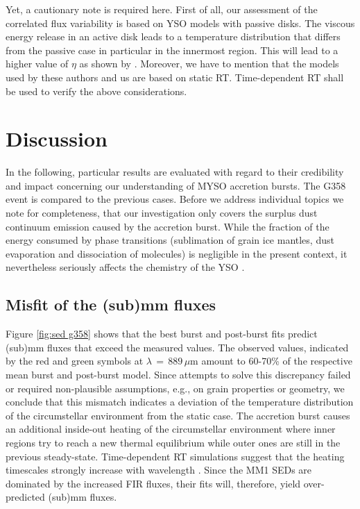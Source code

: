 Yet, a cautionary note is required here. First of all, our assessment of the correlated flux variability is based on YSO models with passive disks. The viscous energy release in an active disk leads to a temperature distribution that differs from the passive case in particular in the innermost region. This will lead to a higher value of $\eta$ as shown by \citet{10.1093/mnras/staa1254}. Moreover, we have to mention that the models used by these authors and us are based on static RT. Time-dependent RT shall be used to verify the above considerations. 

\section{Discussion}\label{disc}
In the following, particular results are evaluated with regard to their credibility and impact concerning our understanding of MYSO accretion bursts. The G358 event is compared to the previous cases. Before we address individual topics we note for completeness, that our investigation only covers the surplus dust continuum emission caused by the accretion burst. While the fraction of
the energy consumed by phase transitions (sublimation of grain ice mantles, dust evaporation and dissociation of molecules)
is negligible in the present context, it nevertheless seriously affects the chemistry of the YSO \citep{2017A&A...604A..15R, 2019MNRAS.485.1843W}.

\subsection{Misfit of the (sub)mm fluxes}\label{misf}
Figure \ref{fig:sed g358} shows that the best burst and post-burst fits predict (sub)mm fluxes that exceed the measured values. %
The observed values, indicated by the red and green symbols at $\lambda\,{=}\,889\,\mu$m amount to 60-70\% of the respective mean burst and post-burst model.
Since attempts to solve this discrepancy failed or required non-plausible assumptions, e.g., on grain properties or geometry, we conclude that this mismatch indicates a deviation of the temperature distribution of the circumstellar environment from the static case. The accretion burst causes an additional inside-out heating of the circumstellar environment where inner regions try to reach a new thermal equilibrium while outer ones are still in the previous steady-state.  Time-dependent RT simulations suggest that the heating timescales 
strongly increase with wavelength
\citep{2011MNRAS.416.1500H, 2013ApJ...765..133J}.  
Since the MM1 SEDs are dominated by the increased FIR fluxes, their fits will, therefore, yield over-predicted (sub)mm fluxes.

